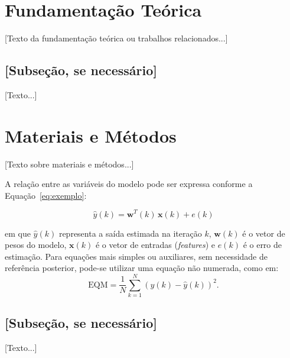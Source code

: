 \documentclass[sigconf, nonacm, screen, language=portuguese, language=spanish, language={main=english}]{acmart}             %
\begin{document}
\section{Fundamentação Teórica}\label{sec:fundamentacao}
[Texto da fundamentação teórica ou trabalhos relacionados...]

\subsection{[Subseção, se necessário]}
[Texto...]


\section{Materiais e Métodos}\label{sec:metodologia}
[Texto sobre materiais e métodos...]

A relação entre as variáveis do modelo pode ser expressa conforme a
Equação~\eqref{eq:exemplo}:

\begin{equation}
  \hat{y}(k) = \mathbf{w}^{T}(k)\,\mathbf{x}(k) + e(k)
  \label{eq:exemplo}
\end{equation}

\noindent em que $\hat{y}(k)$ representa a saída estimada na iteração
$k$, $\mathbf{w}(k)$ é o vetor de pesos do modelo, $\mathbf{x}(k)$ é o
vetor de entradas (\textit{features}) e $e(k)$ é o erro de estimação. Para
equações mais simples ou auxiliares, sem necessidade de referência
posterior, pode-se utilizar uma equação não numerada, como em:
\[
  \text{EQM} = \frac{1}{N}\sum_{k=1}^{N} \left(y(k) - \hat{y}(k)\right)^{2}.
\]

\subsection{[Subseção, se necessário]}
[Texto...]
\end{document}
